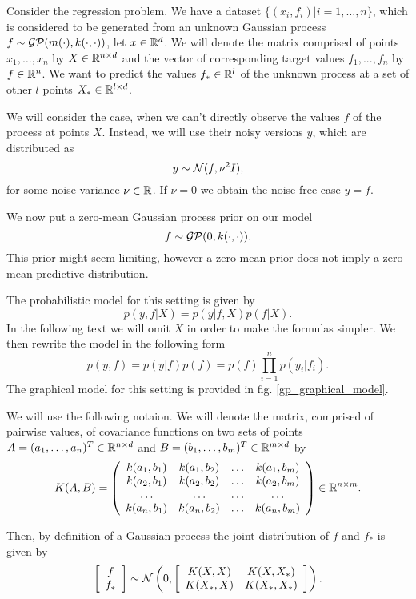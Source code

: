 \label{gp_regression}
Consider the regression problem. We have a dataset $\{(x_i, f_i) | i = 1, \ldots, n\}$, which is considered to be generated from an unknown Gaussian process $f \sim \mathcal{GP}(m(\cdot), k(\cdot, \cdot))$, let $x \in \mathbb{R}^d$.  We will denote the matrix comprised of points $x_1, \ldots, x_n$ by $X \in \mathbb{R}^{n \times d}$ and the vector of corresponding target values $f_1, ..., f_n$ by $f \in \mathbb{R}^n$. We want to predict the values $f_* \in \mathbb{R}^l$ of the unknown process at a set of other $l$ points $X_* \in \mathbb{R}^{l \times d}$.

We will consider the case, when we can't directly observe the values $f$ of the process at points $X$. Instead, we will use their noisy versions $y$, which are distributed as
$$y \sim \mathcal{N}(f, \nu^2 I),$$
for some noise variance $\nu \in \mathbb{R}$. If $\nu = 0$ we obtain the noise-free case $y = f$.

We now put a zero-mean Gaussian process prior on our model
$$f \sim \mathcal{GP}(0, k(\cdot, \cdot)).$$
This prior might seem limiting, however a zero-mean prior does not imply a zero-mean predictive distribution.

The probabilistic model for this setting is given by
$$p(y, f | X) = p(y | f, X) p(f | X).$$
In the following text we will omit $X$ in order to make the formulas simpler. We then rewrite the model in the following form
\begin{equation}\label{standard_model}
	p(y, f) = p(y|f) p(f) = p(f) \prod_{i = 1}^n p(y_i | f_i) .
\end{equation}
The graphical model for this setting is provided in fig. \ref{gp_graphical_model}.

We will use the following notaion. We will denote the matrix, comprised of pairwise values, of covariance functions on two sets of points $A = (a_1, \ldots, a_n)^T \in \mathbb{R}^{n \times d}$ and $B = (b_1, \ldots, b_m)^T \in \mathbb{R}^{m \times d}$ by
$$K(A, B) = 
\left (\begin{array}{cccc} 
	k(a_1, b_1) & k(a_1, b_2) & \ldots & k(a_1, b_m) \\
	k(a_2, b_1) & k(a_2, b_2) & \ldots & k(a_2, b_m) \\
	\ldots & \ldots & \ldots & \ldots \\
	k(a_n, b_1) & k(a_n, b_2) & \ldots & k(a_n, b_m) \\
\end{array} \right) \in \mathbb{R}^{n \times m}.
$$

Then, by definition of a Gaussian process the joint distribution of $f$ and $f_*$ is given by
$$
\left [ \begin{array}{c} f\\ f_* \end{array} \right ]
\sim
\mathcal{N} \left ( 0, \left [\begin{array}{cc} K(X, X) & K(X, X_*)\\ K(X_*, X) & K(X_*, X_*) \end{array} \right] \right ).
$$

